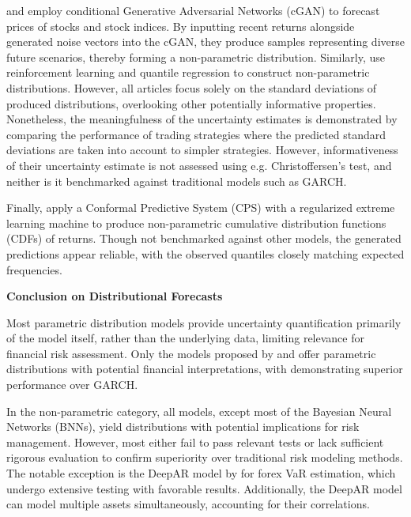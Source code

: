 \textcite{lee2021estimation} and \textcite{vuletic2024finGAN} employ conditional Generative Adversarial Networks (cGAN) to forecast prices of stocks and stock indices. By inputting recent returns alongside generated noise vectors into the cGAN, they produce samples representing diverse future scenarios, thereby forming a non-parametric distribution. Similarly, \textcite{Park2024UncertaintyAware} use reinforcement learning and quantile regression to construct non-parametric distributions. However, all articles focus solely on the standard deviations of produced distributions, overlooking other potentially informative properties. Nonetheless, the meaningfulness of the uncertainty estimates is demonstrated by comparing the performance of trading strategies where the predicted standard deviations are taken into account to simpler strategies. However, informativeness of their uncertainty estimate is not assessed using e.g. Christoffersen's test, and neither is it benchmarked against traditional models such as GARCH.

Finally, \textcite{wang2020fastconformal} apply a Conformal Predictive System (CPS) with a regularized extreme learning machine to produce non-parametric cumulative distribution functions (CDFs) of returns. Though not benchmarked against other models, the generated predictions appear reliable, with the observed quantiles closely matching expected frequencies.

\textbf{Conclusion on Distributional Forecasts}

Most parametric distribution models provide uncertainty quantification primarily of the model itself, rather than the underlying data, limiting relevance for financial risk assessment. Only the models proposed by \textcite{Risk2018gpr} and \textcite{Horenko2020} offer parametric distributions with potential financial interpretations, with \textcite{Horenko2020} demonstrating superior performance over GARCH.

In the non-parametric category, all models, except most of the Bayesian Neural Networks (BNNs), yield distributions with potential implications for risk management. However, most either fail to pass relevant tests or lack sufficient rigorous evaluation to confirm superiority over traditional risk modeling methods. The notable exception is the DeepAR model by \textcite{Fatouros2023DeepVaR} for forex VaR estimation, which undergo extensive testing with favorable results. Additionally, the DeepAR model can model multiple assets simultaneously, accounting for their correlations.

